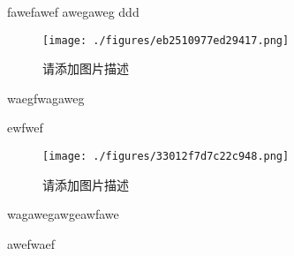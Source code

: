 
\begin{issues}
\issueDraft
\end{issues}

fawefawef
awegaweg
ddd

\begin{figure}[ht]
\centering
\texttt{[image: ./figures/eb2510977ed29417.png]}
\caption{请添加图片描述} \label{fig_testLS_1}
\end{figure}

waegfwagaweg


ewfwef

\begin{figure}[ht]
\centering
\texttt{[image: ./figures/33012f7d7c22c948.png]}
\caption{请添加图片描述} \label{fig_testLS_2}
\end{figure}

wagawegawgeawfawe

awefwaef \cite{KnotsVol4}
